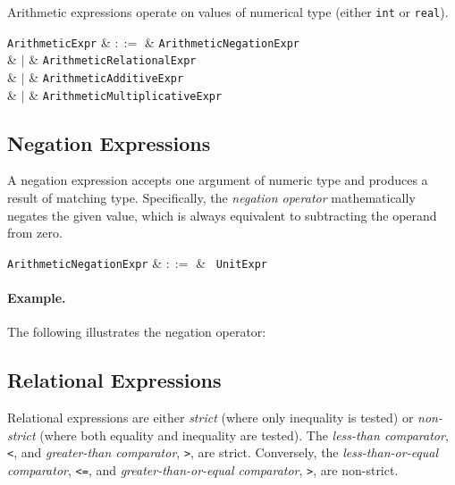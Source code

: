 Arithmetic expressions operate on values of numerical type (either \lstinline{int} or \lstinline{real}).

\begin{syntax}
  \verb+ArithmeticExpr+ & $::=$ & \verb+ArithmeticNegationExpr+\\
                  &  $|$  & \verb+ArithmeticRelationalExpr+\\
                  &  $|$  & \verb+ArithmeticAdditiveExpr+\\
                  &  $|$  & \verb+ArithmeticMultiplicativeExpr+\\
\end{syntax}


\subsection{Negation Expressions}
\label{c_expr_negation}

A negation expression accepts one argument of numeric type and produces a result of matching type.  Specifically, the {\em negation operator} mathematically negates the given value, which is always equivalent to subtracting the operand from zero.

\begin{syntax}
\verb+ArithmeticNegationExpr+ & $::=$ & \token{-}\ \verb+UnitExpr+\\
\end{syntax}

\paragraph{Example.} The following illustrates the negation operator:




\subsection{Relational Expressions}
\label{c_expr_relational}
Relational expressions are either {\em strict} (where only inequality is tested)  or {\em non-strict} (where both equality and inequality are tested).  The {\em less-than comparator}, \lstinline{<}, and {\em greater-than comparator}, \lstinline{>}, are strict.  Conversely, the {\em less-than-or-equal comparator}, \lstinline{<=}, and {\em greater-than-or-equal comparator}, \lstinline{>}, are non-strict.

